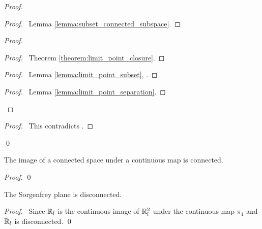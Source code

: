 \begin{proof}
    \pf
    \begin{proof}
        \pf\ Lemma \ref{lemma:subset_connected_subspace}.
    \end{proof}
    \begin{proof}
        \begin{proof}
            \pf\ Theorem \ref{theorem:limit_point_closure}.
        \end{proof}
        \begin{proof}
            \pf\ Lemma \ref{lemma:limit_point_subset}, .
        \end{proof}
        \begin{proof}
            \pf\ Lemma \ref{lemma:limit_point_separation}.
        \end{proof}
    \end{proof}
    \qedstep
    \begin{proof}
        \pf\ This contradicts .
    \end{proof}
    \qed
\end{proof}

\begin{theorem}
    \label{theorem:connected_continuous_image}
    The image of a connected space under a continuous map is connected.
\end{theorem}

\begin{proof}
    \pf
    \qed
\end{proof}

\begin{corollary}
    The Sorgenfrey plane is disconnected.
\end{corollary}

\begin{proof}
    \pf\ Since $\mathbb{R}_l$ is the continuous image of $\mathbb{R}_l^2$ under the continuous map $\pi_1$ and $\mathbb{R}_l$ is disconnected. \qed
\end{proof}

